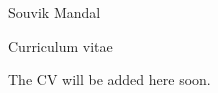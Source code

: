 \documentclass[11pt]{article}
\begin{document}
\vspace*{\fill}
\begin{center}
  {\LARGE Souvik Mandal}\par\bigskip
  {\large Curriculum vitae}\par\bigskip\bigskip
  The CV will be added here soon.
\end{center}
\vspace*{\fill}
\end{document}
